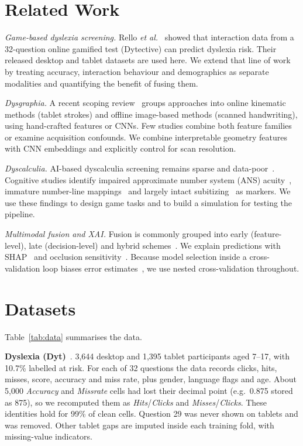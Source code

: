 \documentclass[conference]{IEEEtran}
\begin{document}
\section{Related Work}
\textit{Game-based dyslexia screening.} Rello \emph{et al.}~\cite{rello2020dyt} showed that interaction data from a
32-question online gamified test (Dytective) can predict dyslexia risk. Their released desktop and tablet datasets
are used here. We extend that line of work by treating accuracy, interaction behaviour and demographics as
separate modalities and quantifying the benefit of fusing them.

\textit{Dysgraphia.} A recent scoping review~\cite{fallah2025dysgraphia} groups approaches into online kinematic
methods (tablet strokes) and offline image-based methods (scanned handwriting), using hand-crafted features or CNNs.
Few studies combine both feature families or examine acquisition confounds. We combine interpretable geometry
features with CNN embeddings and explicitly control for scan resolution.

\textit{Dyscalculia.} AI-based dyscalculia screening remains sparse and data-poor~\cite{bhushan2024survey}.
Cognitive studies identify impaired approximate number system (ANS) acuity~\cite{piazza2010acuity}, immature
number-line mappings~\cite{siegler2003numberline} and largely intact subitizing~\cite{decarli2020subitizing} as
markers. We use these findings to design game tasks and to build a simulation for testing the pipeline.

\textit{Multimodal fusion and XAI.} Fusion is commonly grouped into early (feature-level), late (decision-level) and
hybrid schemes~\cite{baltrusaitis2019multimodal}. We explain predictions with SHAP~\cite{lundberg2017shap} and
occlusion sensitivity~\cite{zeiler2014visualizing}. Because model selection inside a cross-validation loop biases
error estimates~\cite{varma2006bias}, we use nested cross-validation throughout.

\section{Datasets}
Table~\ref{tab:data} summarises the data.

\textbf{Dyslexia (Dyt)}~\cite{rello2020dyt}. 3,644 desktop and 1,395 tablet participants aged 7--17, with 10.7\%
labelled at risk. For each of 32 questions the data records clicks, hits, misses, score, accuracy and miss rate, plus
gender, language flags and age. About 5,000 \emph{Accuracy} and \emph{Missrate} cells had lost their decimal point
(e.g.\ 0.875 stored as 875), so we recomputed them as \emph{Hits}/\emph{Clicks} and \emph{Misses}/\emph{Clicks}.
These identities hold for 99\% of clean cells. Question 29 was never shown on tablets and was removed. Other
tablet gaps are imputed inside each training fold, with missing-value indicators.
\end{document}
